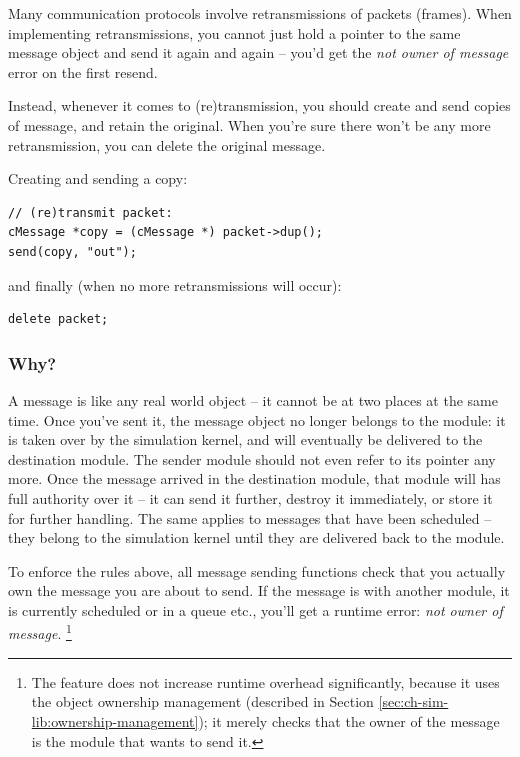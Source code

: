 Many communication protocols involve retransmissions of packets (frames).
When implementing retransmissions, you cannot just hold a pointer
to the same message object and send it again and again -- you'd get
the \textit{not owner of message} error on the first resend.

Instead, whenever it comes to (re)transmission, you should create and
send copies of message, and retain the original.
When you're sure there won't be any more retransmission,
you can delete the original message.

Creating and sending a copy:

\begin{verbatim}
// (re)transmit packet:
cMessage *copy = (cMessage *) packet->dup();
send(copy, "out");
\end{verbatim}

and finally (when no more retransmissions will occur):

\begin{verbatim}
delete packet;
\end{verbatim}


\subsubsection{Why?}

A message is like any real world object -- it cannot be at two places
at the same time. Once you've sent it, the message object
no longer belongs to the module: it is taken over by the simulation kernel,
and will eventually be delivered to the destination module.
The sender module should not even refer to its pointer any more.
Once the message arrived in the destination module, that module
will has full authority over it -- it can send it further,
destroy it immediately, or store it for further handling.
The same applies to messages that have been scheduled -- they
belong to the simulation kernel until they are delivered back to
the module.

To enforce the rules above, all message sending functions
check that you actually own the message you are about to send.
If the message is with another module, it is currently scheduled or
in a queue etc., you'll get a runtime error: \textit{not owner of message}.
  \footnote{The feature does not increase runtime overhead significantly, because
  it uses the object ownership management (described in
  Section \ref{sec:ch-sim-lib:ownership-management});
  it merely checks that the owner of the message is the module that
  wants to send it.}



